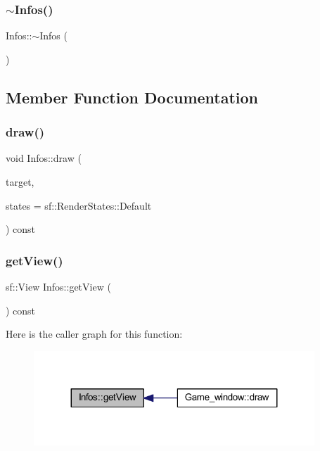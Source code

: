 \subsubsection{\texorpdfstring{$\sim$\+Infos()}{~Infos()}}
{\footnotesize\ttfamily Infos\+::$\sim$\+Infos (\begin{DoxyParamCaption}{ }\end{DoxyParamCaption})}



\subsection{Member Function Documentation}
\mbox{\label{class_infos_af7a440e4bc838e7b3251cbd20c7ad0ae}} 
\subsubsection{\texorpdfstring{draw()}{draw()}}
{\footnotesize\ttfamily void Infos\+::draw (\begin{DoxyParamCaption}\item[{sf\+::\+Render\+Target \&}]{target,  }\item[{sf\+::\+Render\+States}]{states = {\ttfamily sf\+:\+:RenderStates\+:\+:Default} }\end{DoxyParamCaption}) const\hspace{0.3cm}{\ttfamily [virtual]}}

\mbox{\label{class_infos_af68a0d5dafcc767ae4b2b46ac8d7fbe2}} 
\subsubsection{\texorpdfstring{get\+View()}{getView()}}
{\footnotesize\ttfamily sf\+::\+View Infos\+::get\+View (\begin{DoxyParamCaption}{ }\end{DoxyParamCaption}) const}

Here is the caller graph for this function\+:\nopagebreak
\begin{figure}[H]
\begin{center}
\leavevmode
\includegraphics[width=299pt]{class_infos_af68a0d5dafcc767ae4b2b46ac8d7fbe2_icgraph}
\end{center}
\end{figure}
\mbox{\label{class_infos_a5dee8a8817c307c570db905429480d79}} 

